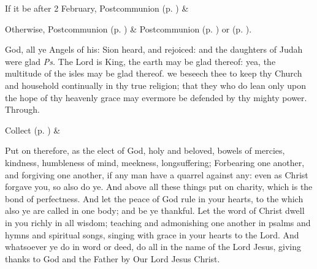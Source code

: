 
\begin{rubric}
    If it be after 2 February,  Postcommunion  (p. \pageref{SPSaints}) \&  
\end{rubric}
\begin{rubric}
	Otherwise,  Postcommunion  (p. \pageref{SPMaryPostChristmas}) \&  Postcommunion  (p. \pageref{SPAgainst}) or  (p. \pageref{SPChiefBishop}).
\end{rubric}


\label{EpiphanyV}


\introit
{} God, all ye Angels of his: Sion heard, and rejoiced: and the daughters of Judah were glad \textit{Ps.} The Lord is King, the earth may be glad thereof: yea, the multitude of the isles may be glad thereof.
\collect\label{EpiphanyVCollect}
 we beseech thee to keep thy Church and household continually in thy true religion; that they who do lean only upon the hope of thy heavenly grace may evermore be defended by thy mighty power. Through.
\begin{rubric}
     Collect  (p. \pageref{SPSaints}) \&  
\end{rubric}
 Put on therefore, as the elect of God, holy and beloved, bowels of mercies, kindness, humbleness of mind, meekness, longsuffering; Forbearing one another, and forgiving one another, if any man have a quarrel against any: even as Christ forgave you, so also do ye. And above all these things put on charity, which is the bond of perfectness. And let the peace of God rule in your hearts, to the which also ye are called in one body; and be ye thankful. Let the word of Christ dwell in you richly in all wisdom; teaching and admonishing one another in psalms and hymns and spiritual songs, singing with grace in your hearts to the Lord. And whatsoever ye do in word or deed, do all in the name of the Lord Jesus, giving thanks to God and the Father by Our Lord Jesus Christ.

